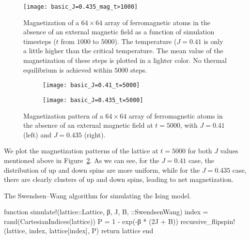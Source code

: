 \begin{figure}[hbt]
    \centering
    \texttt{[image: basic\_J=0.435\_mag\_t>1000]}
    \caption{Magnetization of a \(64 \times 64\) array of ferromagnetic atoms in the absence
        of an external magnetic field as a function of simulation timesteps (\(t\) from
        \(1000\) to \(5000\)). The temperature (\(J = 0.41\) is only a little higher than
        the critical temperature. The mean value of the magnetization of these steps is
        plotted in a lighter color. No thermal equilibrium is achieved within \(5000\)
        steps.}
    \label{fig:mag_J=0.435}
\end{figure}

\begin{figure}[hbt]
    \centering
    \begin{subfigure}{0.49\textwidth}
        \centering
        \texttt{[image: basic\_J=0.41\_t=5000]}
    \end{subfigure}
    \hfill
    \begin{subfigure}{0.49\textwidth}
        \centering
        \texttt{[image: basic\_J=0.435\_t=5000]}
    \end{subfigure}
    \caption{Magnetization pattern of a \(64 \times 64\) array of ferromagnetic atoms in the
        absence of an external magnetic field at \(t = 5000\), with \(J = 0.41\) (left) and
        \(J = 0.435\) (right).}
    \label{fig:t_5000}
\end{figure}

We plot the magnetization patterns of the lattice at \(t = 5000\) for both \(J\) values
mentioned above in Figure~\ref{fig:t_5000}. As we can see, for the \(J = 0.41\) case, the
distribution of up and down spins are more uniform, while for the \(J = 0.435\) case, there
are clearly clusters of up and down spins, leading to net magnetization.

\begin{algorithm}
    \caption{The Swendsen--Wang algorithm for simulating the Ising model.}
    \label{lst:cluster}
    \begin{juliacode}
        function simulate!(lattice::Lattice, β, J, B, ::SwendsenWang)
            index = rand(CartesianIndices(lattice))
            P = 1 - exp(-β * (2J + B))
            recursive_flipspin!(lattice, index, lattice[index], P)
            return lattice
        end
    \end{juliacode}
\end{algorithm}

